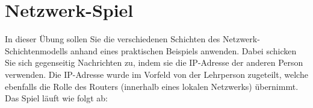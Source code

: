 \chapter{Netzwerk-Spiel}
\label{chapter:netzwerkspiel}

In dieser Übung sollen Sie die verschiedenen Schichten des Netzwerk-Schichtenmodells anhand eines praktischen Beispiels anwenden. Dabei schicken Sie sich gegenseitig Nachrichten zu, indem sie die \gls{IP}-Adresse der anderen Person verwenden. Die \gls{IP}-Adresse wurde im Vorfeld von der Lehrperson zugeteilt, welche ebenfalls die Rolle des Routers (innerhalb eines lokalen Netzwerks) übernimmt. Das Spiel läuft wie folgt ab:

